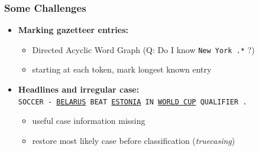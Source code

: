 \documentclass[10pt]{beamer}
\begin{document}
\begin{frame}
\frametitle{Some Challenges}

\begin{itemize}
	\item \textbf{Marking gazetteer entries:}\\
	\begin{itemize}
		\item Directed Acyclic Word Graph (Q: Do I know \texttt{New York .*} ?)
		\item starting at each token, mark longest known entry
	\end{itemize}

 \item \textbf{Headlines and irregular case:}\\\vspace{0.2cm}
\texttt{SOCCER - \underline{BELARUS} BEAT \underline{ESTONIA} IN \underline{WORLD CUP} QUALIFIER .}\vspace{0.1cm}
	\begin{itemize}
		\item useful case information missing
		\item restore most likely case before classification (\emph{truecasing})
	\end{itemize} 
	
\end{itemize} 
\end{frame}



\end{document}
